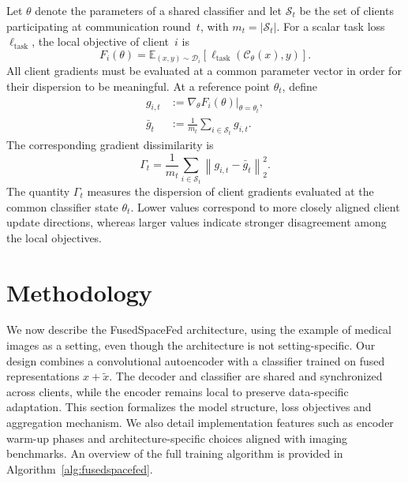 \documentclass[twoside]{article}
\theoremstyle{thmstyleone}%
\theoremstyle{thmstyletwo}%
\theoremstyle{thmstylethree}%
\begin{document}
Let $\theta$ denote the parameters of a shared classifier and let
$\mathcal{S}_t$ be the set of clients participating at communication round~$t$,
with $m_t=|\mathcal{S}_t|$. For a scalar task loss $\ell_{\mathrm{task}}$, the
local objective of client~$i$ is
\begin{equation*}
F_i(\theta)
=
\mathbb{E}_{(x,y)\sim\mathcal{D}_i}
\left[
\ell_{\mathrm{task}}\!\left(\mathcal{C}_{\theta}(x),y\right)
\right].
\end{equation*}
All client gradients must be evaluated at a common parameter vector in order
for their dispersion to be meaningful. At a reference point $\theta_t$, define
\begin{align*}
g_{i,t} &:= \nabla_{\theta}F_i(\theta)\big|_{\theta=\theta_t},\\
\bar{g}_t &:= \frac{1}{m_t}\sum_{i\in\mathcal{S}_t}g_{i,t}.
\end{align*}
The corresponding gradient dissimilarity is
\begin{equation}
\label{eq:gradient_dissimilarity}
\Gamma_t
=
\frac{1}{m_t}
\sum_{i\in\mathcal{S}_t}
\left\|g_{i,t}-\bar{g}_t\right\|_2^2.
\end{equation}
The quantity $\Gamma_t$ measures the dispersion of client gradients evaluated
at the common classifier state $\theta_t$. Lower values correspond to more
closely aligned client update directions, whereas larger values indicate
stronger disagreement among the local objectives.




\section{Methodology}\label{sec:method}

We now describe the FusedSpaceFed architecture, using the example of medical images as a setting, even though the architecture is not setting-specific. Our design combines a convolutional autoencoder with a classifier trained on fused representations $x + \tilde{x}$. The decoder and classifier are shared and synchronized across clients, while the encoder remains local to preserve data-specific adaptation. This section formalizes the model structure, loss objectives and aggregation mechanism. We also detail implementation features such as encoder warm-up phases and architecture-specific choices aligned with imaging benchmarks. An overview of the full training algorithm is provided in Algorithm~\ref{alg:fusedspacefed}.
\end{document}
